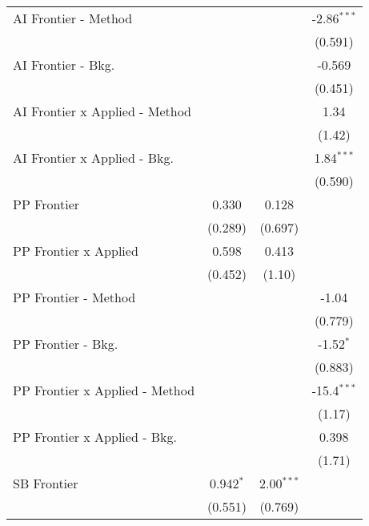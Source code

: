 \begin{tabular}{lccc}
   AI Frontier - Method           &               &              & -2.86$^{***}$\\   
                                  &               &              & (0.591)\\   
   AI Frontier - Bkg.             &               &              & -0.569\\   
                                  &               &              & (0.451)\\   
   AI Frontier x Applied - Method &               &              & 1.34\\   
                                  &               &              & (1.42)\\   
   AI Frontier x Applied - Bkg.   &               &              & 1.84$^{***}$\\   
                                  &               &              & (0.590)\\   
   PP Frontier                    & 0.330         & 0.128        &   \\   
                                  & (0.289)       & (0.697)      &   \\   
   PP Frontier x Applied          & 0.598         & 0.413        &   \\   
                                  & (0.452)       & (1.10)       &   \\   
   PP Frontier - Method           &               &              & -1.04\\   
                                  &               &              & (0.779)\\   
   PP Frontier - Bkg.             &               &              & -1.52$^{*}$\\   
                                  &               &              & (0.883)\\   
   PP Frontier x Applied - Method &               &              & -15.4$^{***}$\\   
                                  &               &              & (1.17)\\   
   PP Frontier x Applied - Bkg.   &               &              & 0.398\\   
                                  &               &              & (1.71)\\   
   SB Frontier                    & 0.942$^{*}$   & 2.00$^{***}$ &   \\   
                                  & (0.551)       & (0.769)      &   \\   

\end{tabular}
